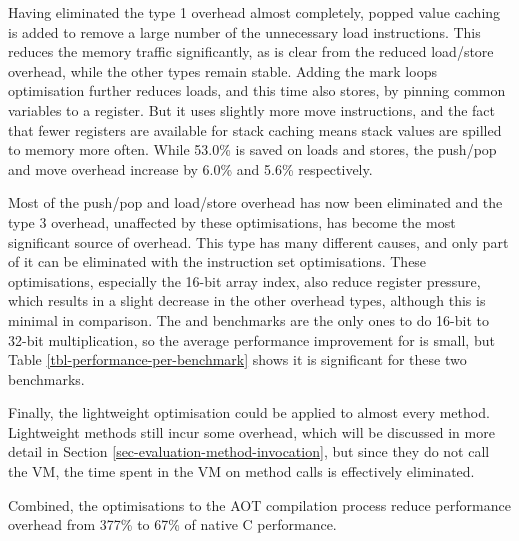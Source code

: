 Having eliminated the type 1 overhead almost completely, popped value caching is added to remove a large number of the unnecessary load instructions. This reduces the memory traffic significantly, as is clear from the reduced load/store overhead, while the other types remain stable. Adding the mark loops optimisation further reduces loads, and this time also stores, by pinning common variables to a register. But it uses slightly more move instructions, and the fact that fewer registers are available for stack caching means stack values are spilled to memory more often. While 53.0\% is saved on loads and stores, the push/pop and move overhead increase by 6.0\% and 5.6\% respectively.

Most of the push/pop and load/store overhead has now been eliminated and the type 3 overhead, unaffected by these optimisations, has become the most significant source of overhead. This type has many different causes, and only part of it can be eliminated with the instruction set optimisations. These optimisations, especially the 16-bit array index, also reduce register pressure, which results in a slight decrease in the other overhead types, although this is minimal in comparison. The  and  benchmarks are the only ones to do 16-bit to 32-bit multiplication, so the average performance improvement for  is small, but Table \ref{tbl-performance-per-benchmark} shows it is significant for these two benchmarks.

Finally, the lightweight optimisation could be applied to almost every method. Lightweight methods still incur some overhead, which will be discussed in more detail in Section \ref{sec-evaluation-method-invocation}, but since they do not call the VM, the time spent in the VM on method calls is effectively eliminated.

Combined, the optimisations to the AOT compilation process reduce performance overhead from 377\% to 67\% of native C performance.

